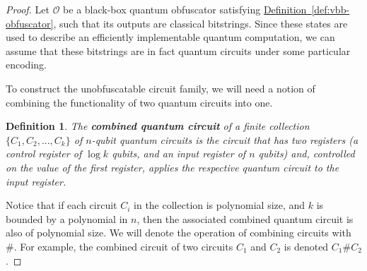 \documentclass[11pt]{article}
\numberwithin{equation}{section}
\newtheorem{theorem}{Theorem}
\newtheorem{definition}{Definition}
\newcommand{\expref}[2]{\texorpdfstring{\hyperref[#2]{#1~\ref{#2}}}{#1~\ref{#2}}}
\begin{document}
{%
\begin{proof}
Let $\mathcal O$ be a black-box quantum obfuscator satisfying \expref{Definition}{def:vbb-obfuscator}, such that its outputs are classical bitstrings. Since these states are used to describe an efficiently implementable quantum computation, we can assume that these bitstrings are in fact quantum circuits under some particular encoding. 

To construct the unobfuscatable circuit family, we will need a notion of combining the functionality of two quantum circuits into one. 
\begin{definition} The {\bf combined quantum circuit} of a finite collection $\lbrace C_1,C_2,...,C_k \rbrace$ of $n$-qubit quantum circuits is the circuit that has two registers (a control register of $\log{k}$ qubits, and an input register of $n$ qubits) and, controlled on the value of the first register, applies the respective quantum circuit to the input register.   
\end{definition}

\noindent Notice that if each circuit $C_i$ in the collection is polynomial size, and $k$ is bounded by a polynomial in $n$, then the associated combined quantum circuit is also of polynomial size. We will denote the operation of combining circuits with $\#$. For example, the combined circuit of two circuits $C_1$ and $C_2$ is denoted $C_1 \# C_2$. 


\end{proof}}
\end{document}
